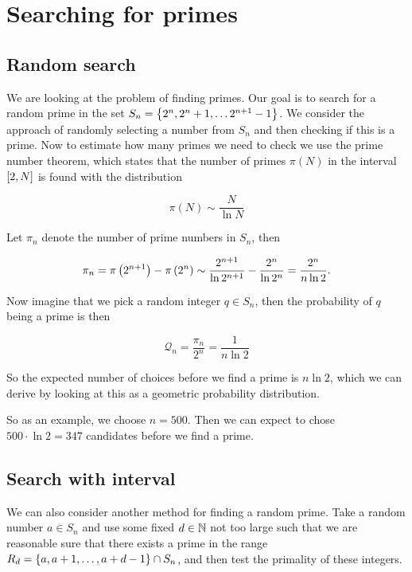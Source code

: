 \section{Searching for primes}

\subsection{Random search} \label{sec:random-search}
  We are looking at the problem of finding primes.
  Our goal is to search for a random prime in the set $S_n = \left\lbrace  2^n, 2^n+1, \dots 2^{n+1}-1  \right\rbrace$.
  We consider the approach of randomly selecting a number from $S_n$ and then checking if this is a prime.
  Now to estimate how many primes we need to check we use the prime number theorem, which states that the number of primes $\pi (N)$ in the interval $\left[ 2, N \right]$ is found with the distribution

  \begin{equation}
    \pi(N) \sim \frac{N}{\ln N}
    \label{eq:pmt}
  \end{equation}

  Let $\pi_n$ denote the number of prime numbers in $S_n$, then

  \begin{equation}
    \pi_n = \pi\left(  2^{n+1}  \right) - \pi\left(  2^{n}  \right) \sim \frac{2^{n+1}}{\ln 2^{n+1}} - \frac{2^{n}}{\ln 2^{n}}
    = \frac{ 2^{n} }{n \ln 2}.
    \label{eq:primes-in-sn}
  \end{equation}

  Now imagine that we pick a random integer $q \in S_n$, then the probability of $q$ being a prime is then

  \begin{equation}
    \mathcal{Q}_n = \frac{\pi_n}{2^n} = \frac{1}{n\ln 2}
    \label{eq:probability-of-prime}
  \end{equation}

  So the expected number of choices before we find a prime is $n \ln 2$, which we can derive by looking at this as a geometric probability distribution.

  So as an example, we choose $n = 500$.
  Then we can expect to chose $500 \cdot \ln 2 = 347$ candidates before we find a prime. 


\subsection{Search with interval}

  We can also consider another method for finding a random prime.
  Take a random number $a \in S_n$ and use some fixed $d \in \mathbb{N}$ not too large such that we are reasonable sure that there exists a prime in the range $R_d = \left\lbrace  a, a+1, \dots, a+d-1  \right\rbrace \cap S_n$, and then test the primality of these integers.
  

